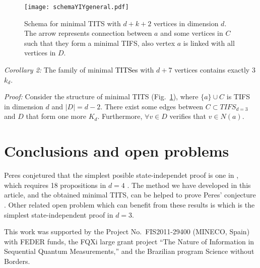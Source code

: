 \documentclass[%
  twocolumn,
 showpacs,
 showkeys,
 preprintnumbers,
 amsmath,amssymb,
 aps,
  pra,
  longbibliography,
 floatfix,
 ]{revtex4-1}
\newcommand{\karl}[1]{\textcolor{black}{#1}}
\def\endproof{ }
\begin{document}

\begin{figure}
\centering
\centerline{\texttt{[image: schemaYIYgeneral.pdf]}}
\caption{\label{Fig3} Schema for minimal TITS with $d+k+2$ vertices in dimension $d$. The arrow represents connection between $a$ and some vertices in $C$ such that they form a minimal TIFS, also vertex $a$ is linked with all vertices in $D$.}
\end{figure}


{\em Corollary 2:} The family of minimal \karl{TITSes} with $d+7$ vertices contains exactly 3 $k_d$.

{\em Proof:} Consider the structure of minimal TITS (Fig.~\ref{Fig3}), where $\{a\} \cup C$ is TIFS in dimension $d$ and $|D| = d-2$. There exist some edges between $C \subset TIFS_{d=3}$ and $D$ that form one more $K_d$. Furthermore, $\forall v \in D$ verifies that $v \in N(a)$. \endproof


\section{Conclusions and open problems}

Peres conjetured that the simplest posible state-independet proof is one in \cite{code17}, which requires 18 propositions in $d=4$ \cite{code19}. The method we have developed in this article, and the obtained minimal TITS, can be helped to prove Peres' conjecture \cite{code20}. Other related open problem which can benefit from these results is which is the simplest state-independent proof in $d=3$.


\begin{acknowledgments}
 This work was supported by the Project No.\ FIS2011-29400 (MINECO, Spain) with FEDER funds, the FQXi large grant project ``The Nature of Information in Sequential Quantum Measurements,'' and the Brazilian program Science without Borders.
\end{acknowledgments}
\end{document}
